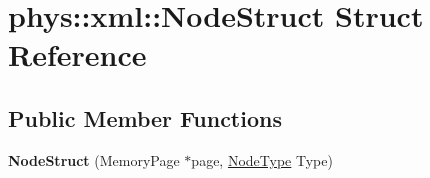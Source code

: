 \hypertarget{structphys_1_1xml_1_1NodeStruct}{
\section{phys::xml::NodeStruct Struct Reference}
\label{d7/dd5/structphys_1_1xml_1_1NodeStruct}
}
\subsection*{Public Member Functions}
\begin{DoxyCompactItemize}
\item 
\hypertarget{structphys_1_1xml_1_1NodeStruct_af6a5de2fa7cd6f0d35ea4df2db7e9deb}{
{\bfseries NodeStruct} (MemoryPage $\ast$page, \hyperlink{namespacephys_1_1xml_a668b0cc666a9d49f7c7222a7552115d3}{NodeType} Type)}
\label{d7/dd5/structphys_1_1xml_1_1NodeStruct_af6a5de2fa7cd6f0d35ea4df2db7e9deb}

\end{DoxyCompactItemize}
